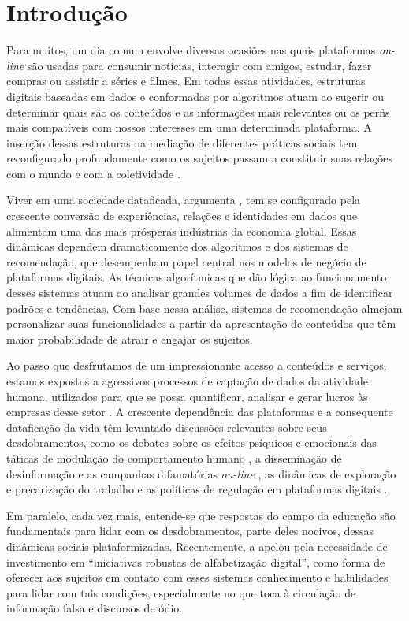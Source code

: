 \section{Introdução}\label{sec-introdução}

Para muitos, um dia comum envolve diversas ocasiões nas quais
plataformas \textit{on-line} são usadas para consumir notícias, interagir com
amigos, estudar, fazer compras ou assistir a séries e filmes. Em todas
essas atividades, estruturas digitais baseadas em dados e conformadas
por algoritmos atuam ao sugerir ou determinar quais são os conteúdos e
as informações mais relevantes ou os perfis mais compatíveis com nossos
interesses em uma determinada plataforma. A inserção dessas estruturas
na mediação de diferentes práticas sociais tem reconfigurado
profundamente como os sujeitos passam a constituir suas relações com o
mundo e com a coletividade \cite{Zuboff2020,Mbembe2021}.

Viver em uma sociedade dataficada, argumenta \textcite{Siles2024}, tem se
configurado pela crescente conversão de experiências, relações e
identidades em dados que alimentam uma das mais prósperas indústrias da
economia global. Essas dinâmicas dependem dramaticamente dos algoritmos
e dos sistemas de recomendação, que desempenham papel central nos
modelos de negócio de plataformas digitais. As técnicas algorítmicas que
dão lógica ao funcionamento desses sistemas atuam ao analisar grandes
volumes de dados a fim de identificar padrões e tendências. Com base
nessa análise, sistemas de recomendação almejam personalizar suas
funcionalidades a partir da apresentação de conteúdos que têm maior
probabilidade de atrair e engajar os sujeitos.

Ao passo que desfrutamos de um impressionante acesso a conteúdos e
serviços, estamos expostos a agressivos processos de captação de dados
da atividade humana, utilizados para que se possa quantificar, analisar
e gerar lucros às empresas desse setor \cite{Couldry2019,Siles2024}. A crescente dependência das plataformas e a consequente
dataficação da vida \cite{VanEs2017} têm levantado discussões
relevantes sobre seus desdobramentos, como os debates sobre os efeitos
psíquicos e emocionais das táticas de modulação do comportamento humano
\cite{Bruno2019}, a disseminação de desinformação e as
campanhas difamatórias \textit{on-line} \cite{Rogers2023}, as dinâmicas de
exploração e precarização do trabalho \cite{Grohmann2023} e as políticas de
regulação em plataformas digitais \cite{Fletcher2023}.

Em paralelo, cada vez mais, entende-se que respostas do campo da
educação são fundamentais para lidar com os desdobramentos, parte deles
nocivos, dessas dinâmicas sociais plataformizadas. Recentemente, a
\textcite{ONU2023} apelou pela necessidade de
investimento em ``iniciativas robustas de alfabetização digital'', como
forma de oferecer aos sujeitos em contato com esses sistemas
conhecimento e habilidades para lidar com tais condições, especialmente
no que toca à circulação de informação falsa e discursos de ódio.

